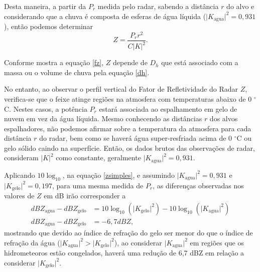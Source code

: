 Desta maneira, a partir da $P_r$ medida pelo radar, sabendo a distância $r$ do alvo e considerando que a chuva é composta de esferas de água líquida ($\vert K_{\mathrm{agua}}\vert^2=0,931$), então podemos determinar 
\begin{equation}
Z = \dfrac{P_r r^2}{C |K|^2}.
\label{zsimples}
\end{equation}

Conforme mostra a equação \ref{fz}, $Z$ depende de $D_h$ que está associado com a massa ou o volume de chuva pela equação \ref{dh}.


No entanto, ao observar o perfil vertical do Fator de Refletividade do Radar $Z$, verifica-se que o feixe atinge regiões na atmosfera com temperaturas abaixo de 0 $^{\circ}$C. Nestes casos, a potência $P_r$ estará associada ao espalhamento em gelo de nuvem em vez da água líquida. Mesmo conhecendo as distâncias $r$ dos alvos espalhadores, não podemos afirmar sobre a temperatura da atmosfera para cada distância $r$ do radar, bem como se haverá água super-resfriada acima de 0 $^{\circ}$C ou gelo sólido caindo na superfície. Então, os dados brutos das observações de radar, consideram $|K|^2$ como constante, geralmente $\vert K_{\mathrm{agua}}\vert^2 = 0,931$. 


Aplicando $10\log_{10}$, na equação \ref{zsimples}, e assumindo  $\vert K_{\mathrm{agua}}\vert^2 = 0,931$ e $\vert K_{\mathrm{gelo}}\vert^2= 0,197$, para uma mesma medida de $P_r$, as diferenças observadas nos valores de $Z$ em dB irão corresponder a
\begin{align}
dBZ_{\mathrm{agua}}-dBZ_{\mathrm{gelo}} &=  10\log_{10}(\vert K_{\mathrm{gelo}}\vert^2 ) - 10\log_{10}(\vert K_{\mathrm{agua}}\vert^2)\\
dBZ_{\mathrm{agua}}- dBZ_{\mathrm{gelo}} &= -6,7 dBZ,
\end{align}
mostrando que devido ao índice de refração do gelo ser menor do que o índice de refração da água ($\vert K_{\mathrm{agua}}\vert^2 > \vert K_{\mathrm{gelo}}\vert^2$), ao considerar $\vert K_{\mathrm{agua}}\vert^2$ em regiões que os hidrometeoros estão congelados, haverá uma redução de 6,7 dBZ em relação a considerar $\vert K_{\mathrm{gelo}}\vert^2$.  

